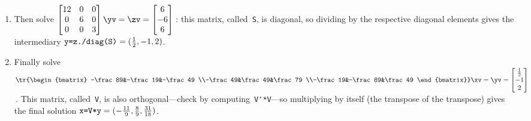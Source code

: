 \begin{example}
\begin{solution}
\begin{enumerate}
\item Then solve \(\begin{bmatrix} 12&0&0\\0&6&0\\0&0&3 \end{bmatrix}\yv=\zv=\begin{bmatrix} 6\\-6\\6 \end{bmatrix}\)\,:  this matrix, called~\verb|S|, is diagonal, so dividing by the respective diagonal elements gives the intermediary \(\verb|y=z./diag(S)|=(\frac12,-1,2)\).

\item Finally solve \(\tr{\begin{bmatrix} -\frac89&-\frac19&-\frac49
\\-\frac49&\frac49&\frac79
\\-\frac19&-\frac89&\frac49 \end{bmatrix}}\xv=\yv=\begin{bmatrix} \frac12\\-1\\2 \end{bmatrix}\)\,. 
This matrix, called~\verb|V|, is also orthogonal---check by computing~\verb|V'*V|---so multiplying by itself (the transpose of the transpose) gives the final solution
\(\verb|x=V*y|=(-\frac{11}9,\frac89,\frac{31}{18})\).

\end{enumerate}
\end{solution}
\end{example}




